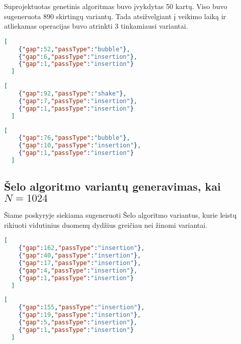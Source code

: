 \documentclass{VUMIFInfBakalaurinis}
\begin{document}

Suprojektuotas genetinis algoritmas buvo įvykdytas 50 kartų.
Viso buvo sugeneruota 890 skirtingų variantų.
Tada atsižvelgiant į veikimo laiką ir atliekamas operacijas buvo atrinkti 3 tinkamiausi variantai. %

\begin{lstlisting}[caption={Algoritmas A1},label={alg:A1},language=json]
  [
    {"gap":52,"passType":"bubble"}, 
    {"gap":6,"passType":"insertion"}, 
    {"gap":1,"passType":"insertion"}
  ]
\end{lstlisting}

\begin{lstlisting}[caption={Algoritmas A2},label={alg:A2},language=json]
  [
    {"gap":92,"passType":"shake"}, 
    {"gap":7,"passType":"insertion"}, 
    {"gap":1,"passType":"insertion"}
  ]
\end{lstlisting}

\begin{lstlisting}[caption={Algoritmas A3},label={alg:A3},language=json]
  [
    {"gap":76,"passType":"bubble"}, 
    {"gap":10,"passType":"insertion"}, 
    {"gap":1,"passType":"insertion"}
  ]
\end{lstlisting}

\subsection{Šelo algoritmo variantų generavimas, kai $N = 1024$}

Šiame poskyryje siekiama sugeneruoti Šelo algoritmo variantus,
kurie leistų rikiuoti vidutinius duomenų dydžius greičiau nei žinomi variantai.

\begin{lstlisting}[caption={Algoritmas B1},label={alg:B1},language=json]
  [
    {"gap":162,"passType":"insertion"}, 
    {"gap":40,"passType":"insertion"}, 
    {"gap":17,"passType":"insertion"}, 
    {"gap":4,"passType":"insertion"}, 
    {"gap":1,"passType":"insertion"}
  ]
\end{lstlisting}

\begin{lstlisting}[caption={Algoritmas B2},label={alg:B2},language=json]
  [
    {"gap":155,"passType":"insertion"}, 
    {"gap":19,"passType":"insertion"}, 
    {"gap":5,"passType":"insertion"}, 
    {"gap":1,"passType":"insertion"}
  ]
\end{lstlisting}
\end{document}
